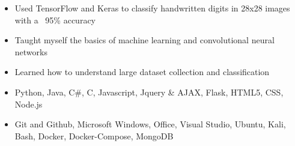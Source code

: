 \documentclass[10pt,a4paper,ragged2e]{altacv}
\begin{document}
\smallskip
\smallskip
{}
\begin{itemize}
\item Used TensorFlow and Keras to classify handwritten digits in 28x28 images with a ~95\% accuracy
\smallskip
\item Taught myself the basics of machine learning and convolutional neural networks
\smallskip
\item Learned how to understand large dataset collection and classification 
\end{itemize}
\cvproject{}

\smallskip
\begin{itemize}
\item Python, Java, C\#, C, Javascript, Jquery \& AJAX, Flask, HTML5, CSS, Node.js
\smallskip
\item Git and Github, Microsoft Windows, Office,  Visual Studio, Ubuntu, Kali, Bash, Docker, Docker-Compose, MongoDB
\smallskip
\end{itemize}


\clearpage


\nocite{*}

\end{document}
